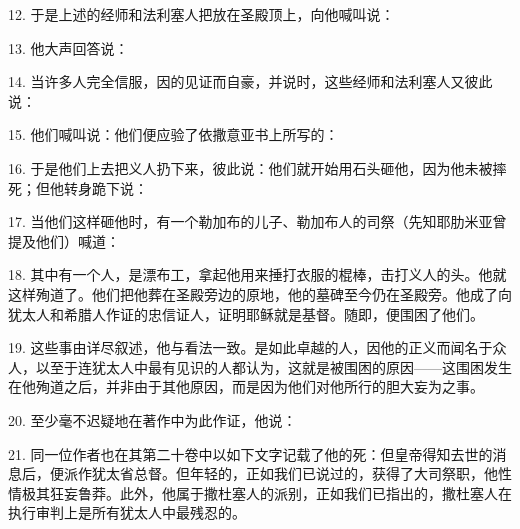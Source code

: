 12. 于是上述的经师和法利塞人把放在圣殿顶上，向他喊叫说：\par

13. 他大声回答说：\par

14. 当许多人完全信服，因的见证而自豪，并说时，这些经师和法利塞人又彼此说：\par

15. 他们喊叫说：他们便应验了依撒意亚书上所写的：\par

16. 于是他们上去把义人扔下来，彼此说：他们就开始用石头砸他，因为他未被摔死；但他转身跪下说：\par

17. 当他们这样砸他时，有一个勒加布的儿子、勒加布人的司祭（先知耶肋米亚曾提及他们）喊道：\par

18. 其中有一个人，是漂布工，拿起他用来捶打衣服的棍棒，击打义人的头。他就这样殉道了。他们把他葬在圣殿旁边的原地，他的墓碑至今仍在圣殿旁。他成了向犹太人和希腊人作证的忠信证人，证明耶稣就是基督。随即，便围困了他们。\par

19. 这些事由详尽叙述，他与看法一致。是如此卓越的人，因他的正义而闻名于众人，以至于连犹太人中最有见识的人都认为，这就是被围困的原因——这围困发生在他殉道之后，并非由于其他原因，而是因为他们对他所行的胆大妄为之事。\par

20. 至少毫不迟疑地在著作中为此作证，他说：\par

21. 同一位作者也在其第二十卷中以如下文字记载了他的死：但皇帝得知去世的消息后，便派作犹太省总督。但年轻的，正如我们已说过的，获得了大司祭职，他性情极其狂妄鲁莽。此外，他属于撒杜塞人的派别，正如我们已指出的，撒杜塞人在执行审判上是所有犹太人中最残忍的。\par

